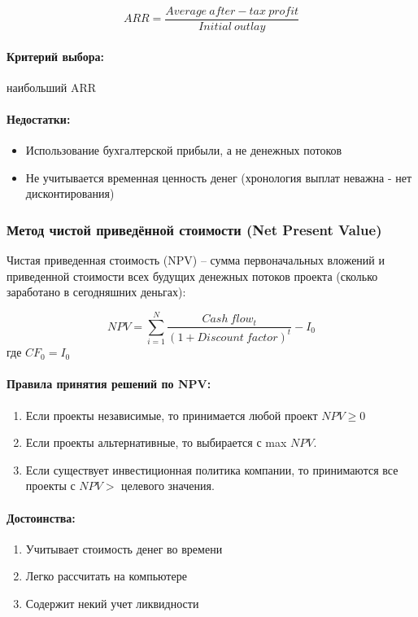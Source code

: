 \documentclass[a4paper,12pt]{article} %
\begin{document}
\[ ARR  = \dfrac{Average \ after-tax \ profit}{Initial \ outlay}  \]

   \paragraph{ Критерий выбора:     }  наибольший ARR
   
    \paragraph{    Недостатки:  }
    
    \begin{itemize}
    	\item  Использование бухгалтерской прибыли,  а не  денежных потоков 
 \item   	Не учитывается временная ценность денег (хронология выплат  неважна -  нет дисконтирования)  
    \end{itemize}
    
    \subsubsection{Метод чистой приведённой стоимости (Net Present Value) }
    
    Чистая приведенная стоимость (NPV) – сумма первоначальных вложений и приведенной стоимости всех будущих денежных потоков проекта
        (сколько заработано в сегодняшних деньгах):
    
    \[ NPV = \sum_{i=1}^{N} \dfrac{Cash \ flow_t}{(1+ Discount \ factor)^t} -I_0 \]
    где $ CF_0 = I_0 $
    

 
\paragraph{ Правила принятия решений по NPV:}
 \begin{enumerate}
 	\item Если проекты независимые, то принимается любой проект $ NPV \geq 0 $
 	\item Если проекты альтернативные, то выбирается с max $  NPV $.
 	 \item Если существует инвестиционная политика компании, то принимаются все проекты с $ NPV > $ целевого значения.
 \end{enumerate}
 
\paragraph{ Достоинства:}
\begin{enumerate}
	\item Учитывает стоимость денег во времени
		\item Легко рассчитать на компьютере
	 	\item Содержит некий учет ликвидности
\end{enumerate}
  
\end{document}
